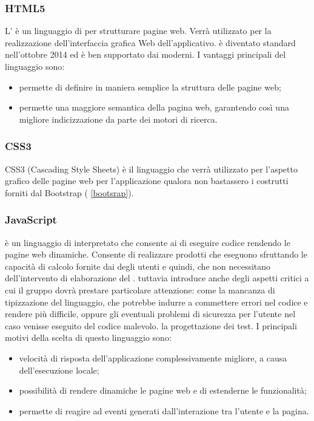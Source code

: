 \documentclass[12pt,a4paper]{article}
\begin{document}
\subsubsection{HTML5}\label{html}
L’ è un linguaggio di  per strutturare pagine web. Verrà utilizzato per la realizzazione dell’interfaccia grafica Web dell’applicativo.  è diventato standard  nell’ottobre 2014 ed è ben supportato dai  moderni. I vantaggi principali del linguaggio sono:

\begin{itemize}
	\item permette di definire in maniera semplice la struttura delle pagine web;
	\item permette una maggiore semantica della pagina web, garantendo così una migliore indicizzazione da parte dei motori di ricerca.
\end{itemize}

\subsubsection{CSS3}\label{css}
CSS3 (Cascading Style Sheets) è il linguaggio che verrà utilizzato per l’aspetto grafico delle pagine web per l'applicazione qualora non bastassero i costrutti forniti dal  Bootstrap ( \ref{bootsrap}).

\subsubsection{JavaScript}\label{javascript}
 è un linguaggio di  interpretato che consente ai  di eseguire codice rendendo le pagine web dinamiche. Consente di realizzare prodotti  che eseguono sfruttando le capacità di calcolo fornite dai  degli utenti e quindi, che non necessitano dell’intervento di elaborazione del .  tuttavia introduce anche degli aspetti critici a cui il gruppo dovrà prestare particolare attenzione: come la mancanza di tipizzazione del linguaggio, che potrebbe indurre a commettere errori nel codice e rendere più difficile, oppure gli eventuali problemi di sicurezza per l'utente nel caso venisse eseguito del codice malevolo. la progettazione dei test. I principali motivi della scelta di questo linguaggio sono:

\begin{itemize}
	\item velocità di risposta dell’applicazione complessivamente migliore, a causa dell’esecuzione locale;
	\item possibilità di rendere dinamiche le pagine web e di estenderne le funzionalità;
	\item permette di reagire ad eventi generati dall’interazione tra l’utente e la pagina.
\end{itemize}
\end{document}
